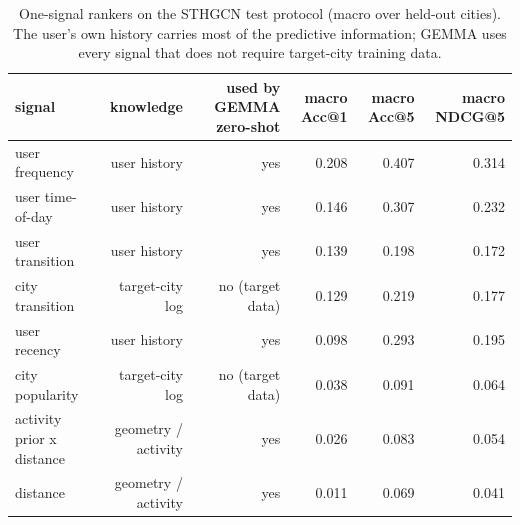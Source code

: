 \begin{table}[t]
\centering\small
\caption{One-signal rankers on the STHGCN test protocol (macro over held-out cities). The user's own history carries most of the predictive information; GEMMA uses every signal that does not require target-city training data.}
\label{tab:A4_information_value}
\begin{tabular}{lrrrrr}
\toprule
signal & knowledge & used by GEMMA zero-shot & macro Acc@1 & macro Acc@5 & macro NDCG@5 \\
\midrule
user frequency & user history & yes & 0.208 & 0.407 & 0.314 \\
user time-of-day & user history & yes & 0.146 & 0.307 & 0.232 \\
user transition & user history & yes & 0.139 & 0.198 & 0.172 \\
city transition & target-city log & no (target data) & 0.129 & 0.219 & 0.177 \\
user recency & user history & yes & 0.098 & 0.293 & 0.195 \\
city popularity & target-city log & no (target data) & 0.038 & 0.091 & 0.064 \\
activity prior x distance & geometry / activity & yes & 0.026 & 0.083 & 0.054 \\
distance & geometry / activity & yes & 0.011 & 0.069 & 0.041 \\
\bottomrule
\end{tabular}
\end{table}
